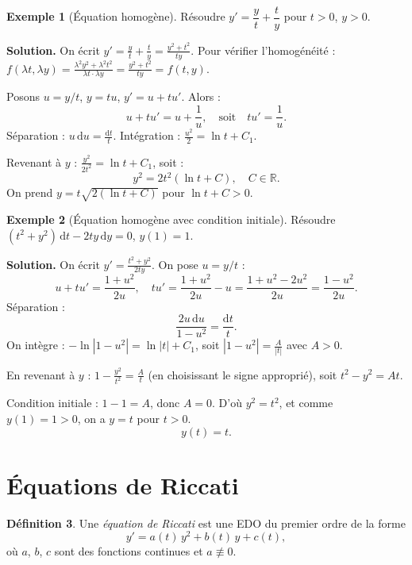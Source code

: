 \documentclass[12pt,a4paper,openany]{book}
\theoremstyle{definition}
\newtheorem{definition}{Définition}[chapter]
\newtheorem{exemple}[definition]{Exemple}
\theoremstyle{plain}
\theoremstyle{remark}
\newcommand{\R}{\mathbb{R}}
\newcommand{\dd}{\mathrm{d}}
\newcommand{\abs}[1]{\left|#1\right|}
\begin{document}
\begin{exemple}[Équation homogène]
\label{ex:homogene-1}
Résoudre $y' = \dfrac{y}{t} + \dfrac{t}{y}$ pour $t > 0$, $y > 0$.

\textbf{Solution.} On écrit $y' = \frac{y}{t} + \frac{t}{y} = \frac{y^2 + t^2}{ty}$. Pour vérifier l'homogénéité : $f(\lambda t, \lambda y) = \frac{\lambda^2 y^2 + \lambda^2 t^2}{\lambda t \cdot \lambda y} = \frac{y^2 + t^2}{ty} = f(t,y)$.

Posons $u = y/t$, $y = tu$, $y' = u + tu'$. Alors :
\[
u + tu' = u + \frac{1}{u}, \quad \text{soit} \quad tu' = \frac{1}{u}.
\]
Séparation : $u\,\dd u = \frac{\dd t}{t}$. Intégration : $\frac{u^2}{2} = \ln t + C_1$.

Revenant à $y$ : $\frac{y^2}{2t^2} = \ln t + C_1$, soit :
\[
\boxed{y^2 = 2t^2(\ln t + C), \quad C \in \R.}
\]
On prend $y = t\sqrt{2(\ln t + C)}$ pour $\ln t + C > 0$.
\end{exemple}

\begin{exemple}[Équation homogène avec condition initiale]
\label{ex:homogene-2}
Résoudre $(t^2 + y^2)\,\dd t - 2ty\,\dd y = 0$, $y(1) = 1$.

\textbf{Solution.} On écrit $y' = \frac{t^2 + y^2}{2ty}$. On pose $u = y/t$ :
\[
u + tu' = \frac{1 + u^2}{2u}, \quad tu' = \frac{1 + u^2}{2u} - u = \frac{1 + u^2 - 2u^2}{2u} = \frac{1 - u^2}{2u}.
\]
Séparation :
\[
\frac{2u\,\dd u}{1 - u^2} = \frac{\dd t}{t}.
\]
On intègre : $-\ln\abs{1 - u^2} = \ln\abs{t} + C_1$, soit $\abs{1 - u^2} = \frac{A}{\abs{t}}$ avec $A > 0$.

En revenant à $y$ : $1 - \frac{y^2}{t^2} = \frac{A}{t}$ (en choisissant le signe approprié), soit $t^2 - y^2 = At$.

Condition initiale : $1 - 1 = A$, donc $A = 0$. D'où $y^2 = t^2$, et comme $y(1) = 1 > 0$, on a $y = t$ pour $t > 0$.
\[
\boxed{y(t) = t.}
\]
\end{exemple}

\section{Équations de Riccati}
\label{sec:riccati}

\begin{definition}
\label{def:riccati}
Une \emph{équation de Riccati} est une EDO du premier ordre de la forme
\begin{equation}
\label{eq:riccati}
y' = a(t)\,y^2 + b(t)\,y + c(t),
\end{equation}
où $a$, $b$, $c$ sont des fonctions continues et $a \not\equiv 0$.
\end{definition}
\end{document}
